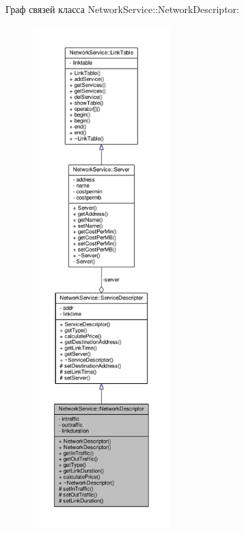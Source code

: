 Граф связей класса Network\+Service\+:\+:Network\+Descriptor\+:
\nopagebreak
\begin{figure}[H]
\begin{center}
\leavevmode
\includegraphics[height=550pt]{class_network_service_1_1_network_descriptor__coll__graph}
\end{center}
\end{figure}
